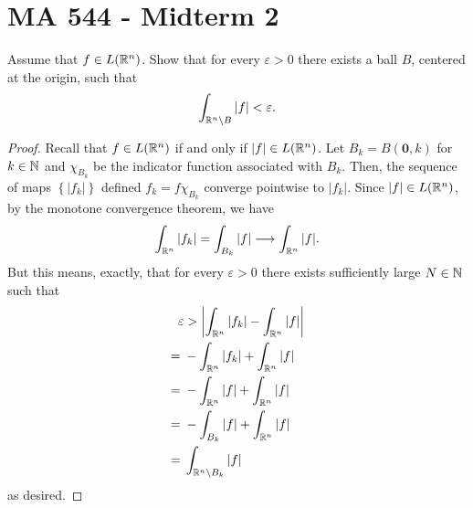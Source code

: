 \section{MA 544 - Midterm 2}
\begin{problem}
Assume that $f\in L(\mathbb{R}^n)$. Show that for every $\varepsilon>0$ there
exists a ball $B$, centered at the origin, such that
\[
\int_{\mathbb{R}^n\setminus B}|f|<\varepsilon.
\]
\end{problem}
\begin{proof}
Recall that $f\in L(\mathbb{R}^n)$ if and only if $|f|\in
L(\mathbb{R}^n)$. Let $B_k= B(\mathbf{0},k)$ for $k\in\mathbb{N}$ and
$\chi_{B_k}$ be the indicator function associated with $B_k$. Then, the
sequence of maps $\left\{|f_k|\right\}$ defined $f_k= f\chi_{B_k}$
converge pointwise to $|f_k|$. Since $|f|\in L(\mathbb{R}^n)$, by the monotone
convergence theorem, we have
\begin{equation}
\label{eq:monotonicity-2-1}
\int_{\mathbb{R}^n} |f_k|=\int_{B_k}|f|\longrightarrow\int_{\mathbb{R}^n}|f|.
\end{equation}
But this means, exactly, that for every $\varepsilon>0$ there exists
sufficiently large $N\in\mathbb{N}$ such that
\begin{equation}
\label{eq:desired-inequality-2-1}
\begin{aligned}
\varepsilon&>\left|\int_{\mathbb{R}^n}|f_k|-\int_{\mathbb{R}^n}|f|\right|\\
={}&-\int_{\mathbb{R}^n}|f_k|+\int_{\mathbb{R}^n}|f|\\
={}&-\int_{\mathbb{R}^n}|f|+\int_{\mathbb{R}^n}|f|\\
={}&-\int_{B_k}|f|+\int_{\mathbb{R}^n}|f|\\
={}&\int_{\mathbb{R}^n\setminus B_k}|f|
\end{aligned}
\end{equation}
as desired.
\end{proof}

